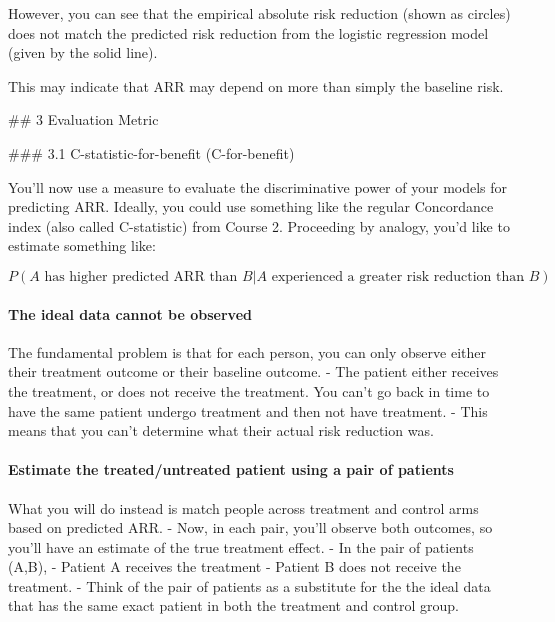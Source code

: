 \documentclass[11pt]{article}
\begin{document}
However, you can see that the empirical absolute risk reduction (shown
as circles) does not match the predicted risk reduction from the
logistic regression model (given by the solid line).

This may indicate that ARR may depend on more than simply the baseline
risk.

     \#\# 3 Evaluation Metric

     \#\#\# 3.1 C-statistic-for-benefit (C-for-benefit)

You'll now use a measure to evaluate the discriminative power of your
models for predicting ARR. Ideally, you could use something like the
regular Concordance index (also called C-statistic) from Course 2.
Proceeding by analogy, you'd like to estimate something like:

\[P(A \text{ has higher predicted ARR than } B| A \text{ experienced a greater risk reduction than } B).\]

    \hypertarget{the-ideal-data-cannot-be-observed}{%
\paragraph{The ideal data cannot be
observed}\label{the-ideal-data-cannot-be-observed}}

The fundamental problem is that for each person, you can only observe
either their treatment outcome or their baseline outcome. - The patient
either receives the treatment, or does not receive the treatment. You
can't go back in time to have the same patient undergo treatment and
then not have treatment. - This means that you can't determine what
their actual risk reduction was.

    \hypertarget{estimate-the-treateduntreated-patient-using-a-pair-of-patients}{%
\paragraph{Estimate the treated/untreated patient using a pair of
patients}\label{estimate-the-treateduntreated-patient-using-a-pair-of-patients}}

What you will do instead is match people across treatment and control
arms based on predicted ARR. - Now, in each pair, you'll observe both
outcomes, so you'll have an estimate of the true treatment effect. - In
the pair of patients (A,B), - Patient A receives the treatment - Patient
B does not receive the treatment. - Think of the pair of patients as a
substitute for the the ideal data that has the same exact patient in
both the treatment and control group.
\end{document}
